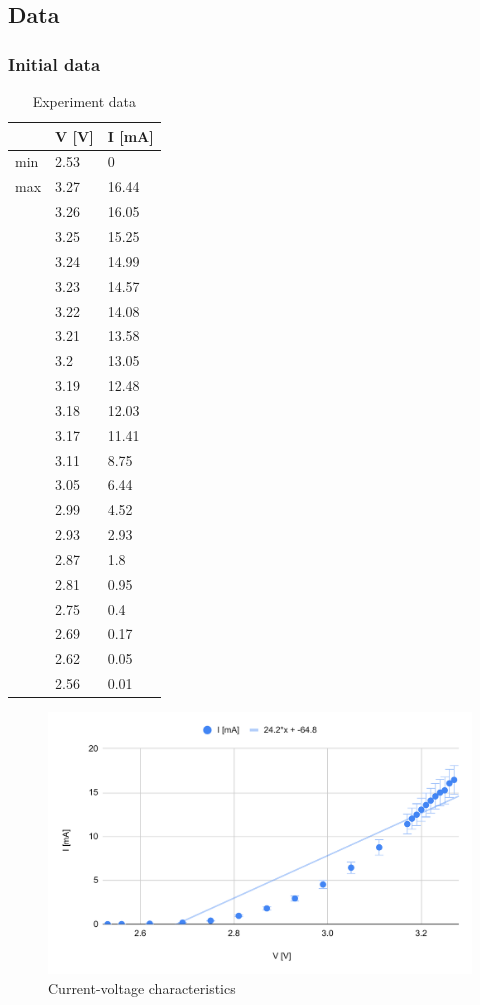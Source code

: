 \subsection*{Data}

\subsubsection*{Initial data}
\begin{table}[H]
    \centering
    \begin{tabular}{l|l|l}
        ~ & V [V]  & I [mA] \\ \hline
        min & 2.53 & 0 \\ \hline 
        max & 3.27 & 16.44 \\ \hline
        ~ & 3.26 & 16.05 \\ 
        ~ & 3.25 & 15.25 \\ 
        ~ & 3.24 & 14.99 \\ 
        ~ & 3.23 & 14.57 \\ 
        ~ & 3.22 & 14.08 \\ 
        ~ & 3.21 & 13.58 \\ 
        ~ & 3.2 & 13.05 \\ 
        ~ & 3.19 & 12.48 \\ 
        ~ & 3.18 & 12.03 \\ 
        ~ & 3.17 & 11.41 \\ 
        ~ & 3.11 & 8.75 \\ 
        ~ & 3.05 & 6.44 \\ 
        ~ & 2.99 & 4.52 \\ 
        ~ & 2.93 & 2.93 \\ 
        ~ & 2.87 & 1.8 \\ 
        ~ & 2.81 & 0.95 \\ 
        ~ & 2.75 & 0.4 \\ 
        ~ & 2.69 & 0.17 \\ 
        ~ & 2.62 & 0.05 \\ 
        ~& 2.56 & 0.01 \\ 
    \end{tabular}
    \caption{Experiment data}
\end{table}


\begin{figure}[H]
	\centering
	\includegraphics[width=12cm]{schematics/chart.pdf}
	\caption{Current-voltage characteristics}
	
\end{figure}

